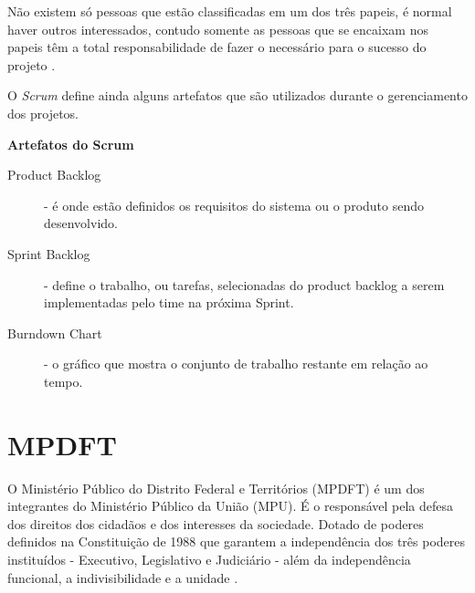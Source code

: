 \documentclass[
	article,			%
	11pt,				%
	oneside,			%
	a4paper,			%
	english,			%
	brazil,				%
	sumario=tradicional
	]{abntex2}
\begin{document}
Não existem só pessoas que estão classificadas em um dos três papeis, é normal
haver outros interessados, contudo somente as pessoas que se encaixam nos
papeis têm a total responsabilidade de fazer o necessário para o sucesso do
projeto \cite{schwaber2002agile}.

O \textit{Scrum} define ainda alguns artefatos que são utilizados durante o
gerenciamento dos projetos.

\textbf{Artefatos do Scrum}

\begin{description}
   \item[Product Backlog] - é onde estão definidos os requisitos do sistema ou o
   produto sendo desenvolvido.
   \item[Sprint Backlog] - define o trabalho, ou tarefas, selecionadas do
   product backlog a serem implementadas pelo time na próxima Sprint.
   \item[Burndown Chart] - o gráfico que mostra o conjunto de trabalho restante
   em relação ao tempo.
\end{description}






\section{MPDFT}

O Ministério Público do Distrito Federal e Territórios (MPDFT) é um dos
integrantes do Ministério Público da União (MPU). É o responsável pela defesa
dos direitos dos cidadãos e dos interesses da sociedade. Dotado de poderes
definidos na Constituição de 1988 que garantem a independência dos três poderes
instituídos - Executivo, Legislativo e Judiciário - além da independência
funcional, a indivisibilidade e a unidade \cite{mpdft}.
\end{document}
